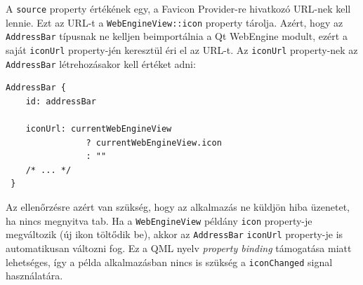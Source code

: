 \documentclass[12pt]{report}
\begin{document}
A \texttt{source} property értékének egy, a Favicon Provider-re hivatkozó URL-nek kell lennie.
Ezt az URL-t a \texttt{WebEngineView::icon} property tárolja. Azért, hogy az \\
\texttt{AddressBar} típusnak ne kelljen beimportálnia a Qt WebEngine modult, ezért a saját
\texttt{iconUrl} property-jén keresztül éri el az URL-t. Az \texttt{iconUrl} property-nek az \\
\texttt{AddressBar} létrehozásakor kell értéket adni:
\begin{lstlisting}[title=main.qml]
 AddressBar {
    id: addressBar

    iconUrl: currentWebEngineView
                ? currentWebEngineView.icon
                : ""
    /* ... */
 }
\end{lstlisting}
Az ellenőrzésre azért van szükség, hogy az alkalmazás ne küldjön hiba üzenetet, ha nincs
megnyitva tab. Ha a \texttt{WebEngineView} példány \texttt{icon} property-je megváltozik
(új ikon töltődik be), akkor az \texttt{AddressBar} \texttt{iconUrl} property-je is
automatikusan változni fog. Ez a QML nyelv \textit{property binding} támogatása miatt
lehetséges, így a példa alkalmazásban nincs is szükség a \texttt{iconChanged} signal
használatára.
\end{document}
